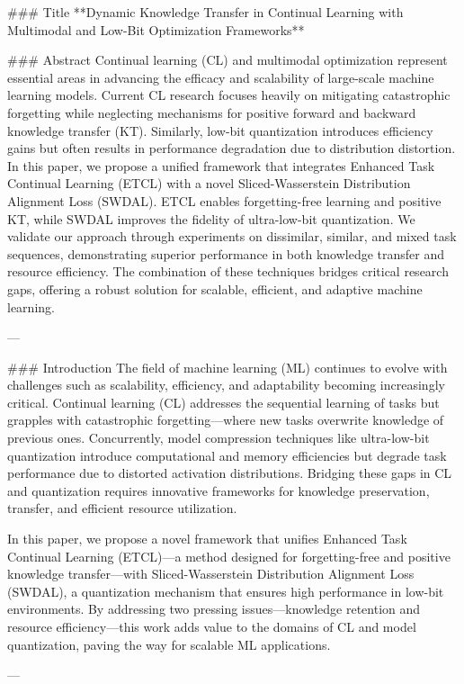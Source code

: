 ### Title
**Dynamic Knowledge Transfer in Continual Learning with Multimodal and Low-Bit Optimization Frameworks**

### Abstract
Continual learning (CL) and multimodal optimization represent essential areas in advancing the efficacy and scalability of large-scale machine learning models. Current CL research focuses heavily on mitigating catastrophic forgetting while neglecting mechanisms for positive forward and backward knowledge transfer (KT). Similarly, low-bit quantization introduces efficiency gains but often results in performance degradation due to distribution distortion. In this paper, we propose a unified framework that integrates Enhanced Task Continual Learning (ETCL) with a novel Sliced-Wasserstein Distribution Alignment Loss (SWDAL). ETCL enables forgetting-free learning and positive KT, while SWDAL improves the fidelity of ultra-low-bit quantization. We validate our approach through experiments on dissimilar, similar, and mixed task sequences, demonstrating superior performance in both knowledge transfer and resource efficiency. The combination of these techniques bridges critical research gaps, offering a robust solution for scalable, efficient, and adaptive machine learning.

---

### Introduction
The field of machine learning (ML) continues to evolve with challenges such as scalability, efficiency, and adaptability becoming increasingly critical. Continual learning (CL) addresses the sequential learning of tasks but grapples with catastrophic forgetting—where new tasks overwrite knowledge of previous ones. Concurrently, model compression techniques like ultra-low-bit quantization introduce computational and memory efficiencies but degrade task performance due to distorted activation distributions. Bridging these gaps in CL and quantization requires innovative frameworks for knowledge preservation, transfer, and efficient resource utilization.

In this paper, we propose a novel framework that unifies Enhanced Task Continual Learning (ETCL)—a method designed for forgetting-free and positive knowledge transfer—with Sliced-Wasserstein Distribution Alignment Loss (SWDAL), a quantization mechanism that ensures high performance in low-bit environments. By addressing two pressing issues—knowledge retention and resource efficiency—this work adds value to the domains of CL and model quantization, paving the way for scalable ML applications.

---

